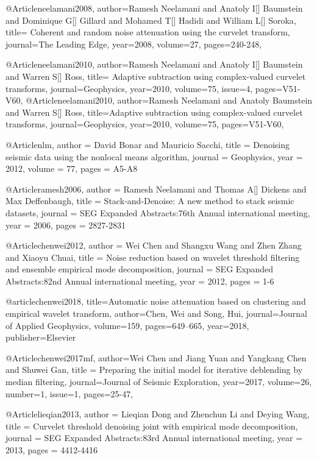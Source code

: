 @Article{neelamani2008,
  author={Ramesh Neelamani and Anatoly I[] Baumstein and Dominique G[] Gillard and Mohamed T[] Hadidi and William L[] Soroka},
  title={	
Coherent and random noise attenuation using the curvelet transform},
  journal={The Leading Edge},
  year=2008,
  volume=27,
  pages={240-248},
}


@Article{neelamani2010,
  author={Ramesh Neelamani and Anatoly I[] Baumstein and Warren S[] Ross},
  title={		
Adaptive subtraction using complex-valued curvelet transforms},
  journal={Geophysics},
  year=2010,
  volume=75,
  issue=4,
  pages={V51-V60},
}
@Article{neelamani2010,
  author={Ramesh Neelamani and Anatoly Baumstein and Warren S[] Ross},
  title={Adaptive subtraction using complex-valued curvelet transforms},
  journal={Geophysics},
  year=2010,
  volume=75,
  pages={V51-V60},
}


@Article{nlm,
  author = 	 {David Bonar and Mauricio Sacchi},
  title = 	 {Denoising seismic data using the nonlocal means algorithm},
  journal = 	 {Geophysics},
  year = 	 2012,
  volume =	 77,
  pages =	 {A5-A8}
}

@Article{ramesh2006,
  author = 	 {Ramesh Neelamani and Thomas A[] Dickens and Max Deffenbaugh},
  title = 	 {	
Stack‐and‐Denoise: A new method to stack seismic datasets},
  journal = 	 {SEG Expanded Abstracts:76th Annual international meeting},
  year = 	 2006,
  pages =	 {2827-2831}
}

@Article{chenwei2012,
  author = 	 {Wei Chen and Shangxu Wang and Zhen Zhang and Xiaoyu Chuai},
  title = 	 {Noise reduction based on wavelet threshold filtering and ensemble empirical mode decomposition},
  journal = 	 {SEG Expanded Abstracts:82nd Annual international meeting},
  year = 	 2012,
  pages =	 {1-6}
}

@article{chenwei2018,
  title={Automatic noise attenuation based on clustering and empirical wavelet transform},
  author={Chen, Wei and Song, Hui},
  journal={Journal of Applied Geophysics},
  volume={159},
  pages={649--665},
  year={2018},
  publisher={Elsevier}
}

@Article{chenwei2017mf,
  author={Wei Chen and Jiang Yuan and Yangkang Chen and Shuwei Gan},
  title = {Preparing the initial model for iterative deblending by median filtering},
  journal={Journal of Seismic Exploration},
  year=2017,
  volume=26,
  number=1,
  issue=1,
  pages={25-47},
}

@Article{lieqian2013,
  author = 	 {Lieqian Dong and Zhenchun Li and Deying Wang},
  title = 	 {Curvelet threshold denoising joint with empirical mode decomposition},
  journal = 	 {SEG Expanded Abstracts:83rd Annual international meeting},
  year = 	 2013,
  pages =	 {4412-4416}
}



